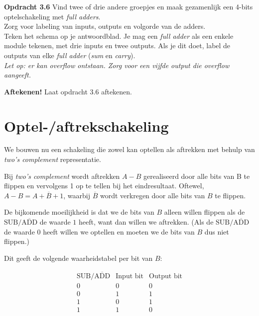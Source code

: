 \documentclass[11pt,a5paper]{report}
\begin{document}
\begin{framed}
\textbf{Opdracht 3.6} 
Vind twee of drie andere groepjes en maak gezamenlijk een 4-bits optelschakeling met \textit{full adders}.\\
Zorg voor labeling van inputs, outputs en volgorde van de adders.\\

Teken het schema op je antwoordblad. Je mag een \textit{full adder} als een enkele module tekenen, met drie inputs en twee outputs. Als je dit doet, label de outputs van elke \textit{full adder} (\textit{sum} en \textit{carry}).\\

\textit{Let op: er kan overflow ontstaan. Zorg voor een vijfde output die overflow aangeeft.}
\end{framed}

\begin{framed}
\textbf{Aftekenen!} Laat opdracht 3.6 aftekenen.
\end{framed}

\newpage
\section*{Optel-/aftrekschakeling}

We bouwen nu een schakeling die zowel kan optellen als aftrekken met behulp van \textit{two's complement} representatie.

Bij \textit{two's complement} wordt aftrekken $A - B$ gerealiseerd door alle bits van B te flippen en vervolgens 1 op te tellen bij het eindresultaat. Oftewel, $A - B = A + \overline{B} + 1$, waarbij $\overline{B}$ wordt verkregen door alle bits van $B$ te flippen.

De bijkomende moeilijkheid is dat we de bits van $B$ alleen willen flippen als de $\textrm{SUB/}\overline{\textrm{ADD}}$ de waarde $1$ heeft, want dan willen we aftrekken. (Als de $\textrm{SUB/}\overline{\textrm{ADD}}$ de waarde $0$ heeft willen we optellen en moeten we de bits van $B$ dus niet flippen.)

Dit geeft de volgende waarheidstabel per bit van $B$:

\[
\begin{array}{cc|c}
\textrm{SUB/}\overline{\textrm{ADD}} & \textrm{Input bit} & \textrm{Output bit} \\
\hline
0 & 0 & 0 \\
0 & 1 & 1 \\
1 & 0 & 1 \\
1 & 1 & 0
\end{array}
\]
\end{document}
